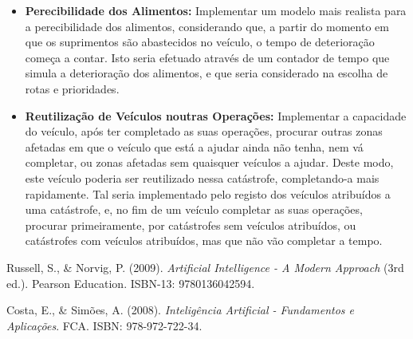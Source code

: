 \documentclass[a4paper,12pt]{scrreprt}
\begin{document}
\begin{itemize}
    \item {\textbf{Perecibilidade dos Alimentos:}} Implementar um modelo mais realista para a perecibilidade dos alimentos, considerando
    que, a partir do momento em que os suprimentos são abastecidos no veículo, o tempo de deterioração começa a contar. Isto seria efetuado
    através de um contador de tempo que simula a deterioração dos alimentos, e que seria considerado na escolha de rotas e prioridades.

    \item{\textbf{Reutilização de Veículos noutras Operações:}} Implementar a capacidade do veículo, após ter completado as suas operações,
    procurar outras zonas afetadas em que o veículo que está a ajudar ainda não tenha, nem vá completar, ou zonas afetadas sem quaisquer veículos a ajudar.
    Deste modo, este veículo poderia ser reutilizado nessa catástrofe, completando-a mais rapidamente. 
    Tal seria implementado pelo registo dos veículos atribuídos a uma catástrofe, e, no fim de um veículo completar as suas operações, procurar
    primeiramente, por catástrofes sem veículos atribuídos, ou catástrofes com veículos atribuídos, mas que não vão completar a tempo.
\end{itemize}



\renewcommand\bibname{Referências}

\begin{thebibliography}{9}

Russell, S., \& Norvig, P. (2009). \textit{Artificial Intelligence - A Modern Approach} (3rd ed.). Pearson Education. ISBN-13: 9780136042594.

Costa, E., \& Simões, A. (2008). \textit{Inteligência Artificial - Fundamentos e Aplicações}. FCA. ISBN: 978-972-722-34.

\end{thebibliography}


\end{document}

